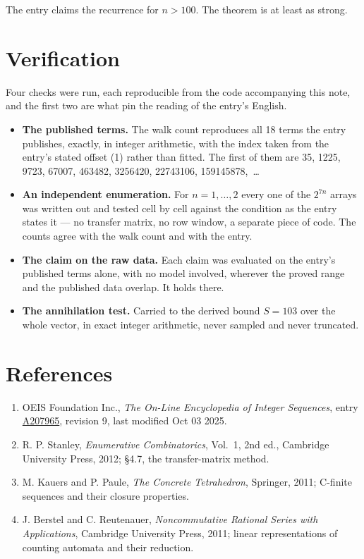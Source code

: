 \documentclass[11pt]{article}
\theoremstyle{definition}
\begin{document}
The entry claims the recurrence for $n > 100$. The theorem is at least as strong.

\section{Verification}

Four checks were run, each reproducible from the code accompanying this note, and the first two are what pin the reading of the entry's English.

\begin{itemize}

\item {\bfseries The published terms.} The walk count reproduces all 18 terms the entry publishes, exactly, in integer arithmetic, with the index taken from the entry's stated offset (1) rather than fitted. The first of them are 35, 1225, 9723, 67007, 463482, 3256420, 22743106, 159145878,~\dots

\item {\bfseries An independent enumeration.} For $n = 1,\dots,2$ every one of the $2^{7n}$ arrays was written out and tested cell by cell against the condition as the entry states it --- no transfer matrix, no row window, a separate piece of code. The counts agree with the walk count and with the entry.

\item {\bfseries The claim on the raw data.} Each claim was evaluated on the entry's published terms alone, with no model involved, wherever the proved range and the published data overlap. It holds there.

\item {\bfseries The annihilation test.} Carried to the derived bound $S = 103$ over the whole vector, in exact integer arithmetic, never sampled and never truncated.

\end{itemize}

\section{References}

\begin{enumerate}

\item OEIS Foundation Inc., \emph{The On-Line Encyclopedia of Integer Sequences}, entry \href{https://oeis.org/A207965}{A207965}, revision 9, last modified Oct 03 2025.

\item R. P. Stanley, \emph{Enumerative Combinatorics}, Vol.~1, 2nd ed., Cambridge University Press, 2012; \S4.7, the transfer-matrix method.

\item M. Kauers and P. Paule, \emph{The Concrete Tetrahedron}, Springer, 2011; C-finite sequences and their closure properties.

\item J. Berstel and C. Reutenauer, \emph{Noncommutative Rational Series with Applications}, Cambridge University Press, 2011; linear representations of counting automata and their reduction.

\end{enumerate}
\end{document}
